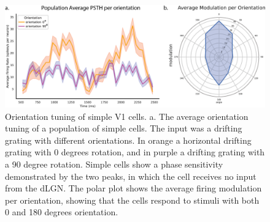 \documentclass[12pt]{article}
\begin{document}
\begin{figure}[H]
    \centering
    \includegraphics[width=1.0 \textwidth]{figures/figure_simple_orientation_tuning.png}
    \caption{Orientation tuning of simple V1 cells. a. The average orientation tuning of a population of simple cells. The input was a drifting grating with different orientations. In orange a horizontal drifting grating with 0 degrees rotation, and in purple a drifting grating with a 90 degree rotation. Simple cells show a phase sensitivity demonstrated by the two peaks, in which the cell receives no input from the dLGN. The polar plot shows the average firing modulation per orientation, showing that the cells respond to stimuli with both 0 and 180 degrees orientation.}
    \label{fig:simple cell orientation tuning}
\end{figure}
\end{document}
